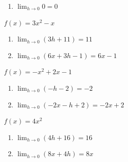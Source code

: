 \documentclass{ximera}
\begin{document}
\begin{question}
\begin{problem}
\begin{solution}
\begin{enumerate}
\item $\lim_{h \rightarrow 0} 0 = 0$
\end{enumerate}
\end{solution}
\end{problem}

\begin{problem}
$f(x) = 3x^2 - x$

\begin{solution}
\begin{enumerate}
\item $\lim_{h \rightarrow 0} (3h+11)= 11$

\item $\lim_{h \rightarrow 0} (6x+3h-1)= 6x-1$
\end{enumerate}
\end{solution}
\end{problem}

\begin{problem}
$f(x) = -x^2 + 2x - 1$

\begin{solution}
\begin{enumerate}
\item $\lim_{h \rightarrow 0} (-h-2) = -2$

\item $\lim_{h \rightarrow 0} (-2x-h+2) = -2x+2$
\end{enumerate}
\end{solution}
\end{problem}

\begin{problem}\label{diffquotexerlasta}
  $f(x) = 4x^2$ 

\begin{solution}
\begin{enumerate}
\item $\lim_{h \rightarrow 0} (4h+16) = 16$

\item $\lim_{h \rightarrow 0} (8x+4h) = 8x$
\end{enumerate}
\end{solution}
\end{problem}

\end{question}
\end{document}

